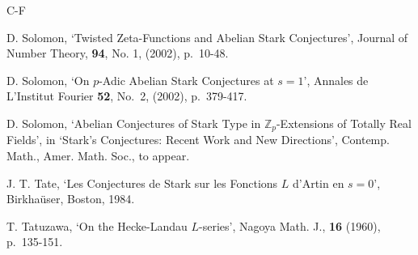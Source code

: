 \documentclass[12pt]{article}
\newcounter{rem}[section]%
\newcommand{\bbZ}{\ensuremath{\mathbb{Z}}}
\newcommand{\rem}{\refstepcounter{rem}\noindent{\sc Remark \therem}}%
\renewcommand{\therem}{\thesection.\arabic{rem}}
\begin{document}
\begin{thebibliography}{C-F}

D. Solomon, `Twisted Zeta-Functions and Abelian Stark
Conjectures', Journal of Number Theory, {\bf 94}, No.
1, (2002), p.~10-48.

D. Solomon, `On $p$-Adic Abelian Stark Conjectures
at $s = 1$',
Annales de L'Institut Fourier
{\bf 52}, No.~2, (2002), p.~379-417.

D. Solomon, `Abelian Conjectures of Stark Type in $\bbZ_p$-Extensions
of Totally Real Fields', in `Stark's Conjectures:
Recent Work and New Directions', Contemp. Math.,
Amer. Math. Soc., to appear.



J. T. Tate, `Les Conjectures de Stark sur les Fonctions $L$
d'Artin en $s=0$', Birkha\"{u}ser, Boston, 1984.

T. Tatuzawa, `On the Hecke-Landau $L$-series', Nagoya Math. J.,
{\bf 16} (1960), p.~135-151.



\end{thebibliography}
\end{document}
